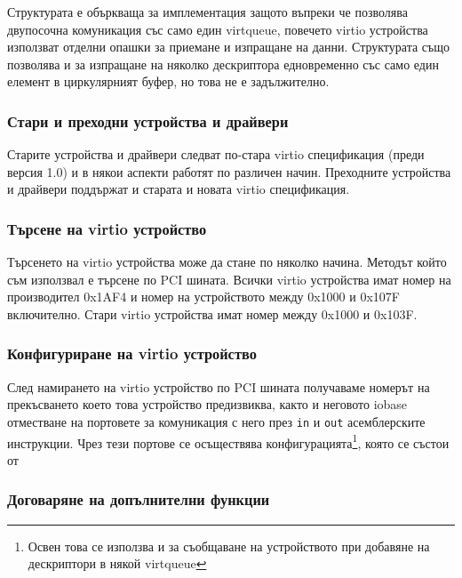Структурата е объркваща за имплементация защото въпреки че позволява двупосочна комуникация със само един virtqueue, повечето virtio устройства използват отделни опашки за приемане и изпращане на данни. Структурата също позволява и за изпращане на няколко дескриптора едновременно със само един елемент в циркулярният буфер, но това не е задължително.

\subsubsection{Стари и преходни устройства и драйвери}
Старите устройства и драйвери следват по-стара virtio спецификация (преди версия 1.0) и в някои аспекти работят по различен начин. Преходните устройства и драйвери поддържат и старата и новата virtio спецификация.

\subsubsection{Търсене на virtio устройство}
Търсенето на virtio устройства може да стане по няколко начина. Методът който съм използвал е търсене по PCI шината. Всички virtio устройства имат номер на производител 0x1AF4 и номер на устройството между 0x1000 и 0x107F включително. Стари virtio устройства имат номер между 0x1000 и 0x103F.

\subsubsection{Конфигуриране на virtio устройство}
След намирането на virtio устройство по PCI шината получаваме номерът на прекъсването което това устройство предизвиква, както и неговото iobase отместване на портовете за комуникация с него през {\tt in} и {\tt out} асемблерските инструкции. Чрез тези портове се осъществява конфигурацията\footnote{Освен това се използва и за съобщаване на устройството при добавяне на дескриптори в някой virtqueue}, която се състои от %

\subsubsection{Договаряне на допълнителни функции}

